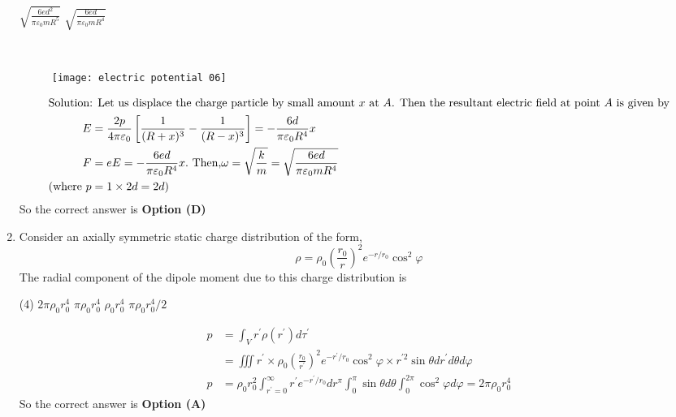 \begin{enumerate}
\begin{tasks}
		\task[\textbf{C.}]  $\sqrt{\frac{6 e d^{2}}{\pi \varepsilon_{0} m R^{5}}}$
		\task[\textbf{D.}] $\sqrt{\frac{6 e d}{\pi \varepsilon_{0} m R^{4}}}$
	\end{tasks}
	\begin{answer}$\left. \right. $
		\begin{figure}[H]
			\centering
			\texttt{[image: electric potential 06]}
		\end{figure}
		\begin{align*}
		\intertext{Solution: Let us displace the charge particle by small amount $x$ at $A$. Then the resultant electric field at point $A$ is given by}
		E&=\frac{2 p}{4 \pi \varepsilon_{0}}\left[\frac{1}{(R+x)^{3}}-\frac{1}{(R-x)^{3}}\right]=-\frac{6 d}{\pi \varepsilon_{0} R^{4}} x\\
		F&=e E=-\frac{6 e d}{\pi \varepsilon_{0} R^{4}} x .\text{ Then,} \omega=\sqrt{\frac{k}{m}}=\sqrt{\frac{6 e d}{\pi \varepsilon_{0} m R^{4}}}\\
		(\text{where }p&=1 \times 2 d=2 d )
		\end{align*}
		So the correct answer is \textbf{Option (D)}
	\end{answer}
	\item Consider an axially symmetric static charge distribution of the form,
	$$
	\rho=\rho_{0}\left(\frac{r_{0}}{r}\right)^{2} e^{-r / r_{0}} \cos ^{2} \varphi
	$$
	The radial component of the dipole moment due to this charge distribution is
	{}
	\begin{tasks}(4)
		\task[\textbf{A.}] $2 \pi \rho_{0} r_{0}^{4}$
		\task[\textbf{B.}] $\pi \rho_{0} r_{0}^{4}$
		\task[\textbf{C.}] $\rho_{0} r_{0}^{4}$
		\task[\textbf{D.}] $\pi \rho_{0} r_{0}^{4} / 2$
	\end{tasks}
	\begin{answer}
		\begin{align*}
		p&=\int_{V} r^{\prime} \rho\left(r^{\prime}\right) d \tau^{\prime}\\&=\iiint r^{\prime} \times \rho_{0}\left(\frac{r_{0}}{r^{\prime}}\right)^{2} e^{-r^{\prime} / r_{0}} \cos ^{2} \varphi \times r^{\prime 2} \sin \theta d r^{\prime} d \theta d \varphi\\
		p&=\rho_{0} r_{0}^{2} \int_{r^{\prime}=0}^{\infty} r^{\prime} e^{-r^{\prime} / r_{0}} d r^{\pi} \int_{0}^{\pi} \sin \theta d \theta \int_{0}^{2 \pi} \cos ^{2} \varphi d \varphi=2 \pi \rho_{0} r_{0}^{4}
		\end{align*}
		So the correct answer is \textbf{Option (A)}
	\end{answer}

\end{enumerate}
